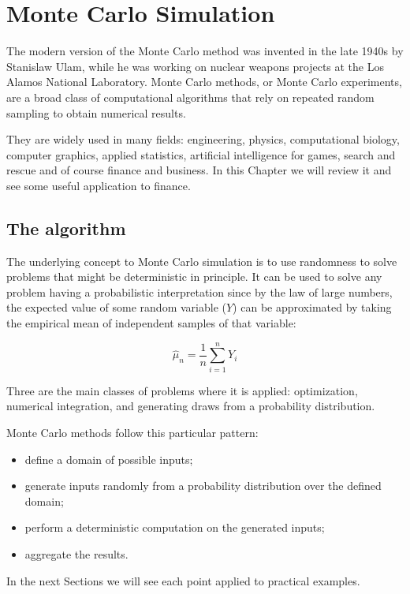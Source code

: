 \chapter{Monte Carlo Simulation}\label{cap:montecarlo}

The modern version of the Monte Carlo method was invented in the late
1940s by Stanislaw Ulam, while he was working on nuclear weapons
projects at the Los Alamos National Laboratory.
Monte Carlo methods, or Monte Carlo experiments, are a broad class of
computational algorithms that rely on repeated random sampling to obtain
numerical results. 

They are widely used in many fields: engineering,
physics, computational biology, computer graphics, applied statistics,
artificial intelligence for games, search and rescue and of course
finance and business.
In this Chapter we will review it and see some useful application to finance.

\section{The algorithm}\label{whats-monte-carlo-simulation}

The underlying concept to Monte Carlo simulation is to use randomness to solve
problems that might be deterministic in principle. It can be used to 
solve any problem
having a probabilistic interpretation since by the law of large numbers, the
expected value of some random variable ($Y$) can be approximated by taking the
empirical mean of independent samples of that variable:

\[ \hat{\mu}_n = \frac{1}{n}\sum_{i=1}^{n}{Y_i} \]

Three are the main classes of problems where it is applied: optimization, numerical
integration, and generating draws from a probability distribution.

Monte Carlo methods follow this particular pattern:
\begin{itemize}
\tightlist
\item
  define a domain of possible inputs;
\item
  generate inputs randomly from a probability distribution over the
  defined domain;
\item
  perform a deterministic computation on the generated inputs;
\item
  aggregate the results.
\end{itemize}
In the next Sections we will see each point applied to practical examples.

